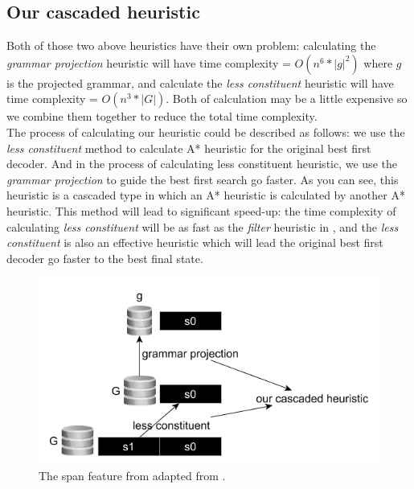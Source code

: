 \subsection{Our cascaded heuristic}
Both of those two above heuristics have their own problem: calculating the \textit{grammar projection} heuristic will have time complexity = $O(n^6*|g|^2)$ where $g$ is the projected grammar, and calculate the \textit{less constituent} heuristic will have time complexity = $O(n^3*|G|)$. Both of calculation may be a little expensive so we combine them together to reduce the total time complexity. \\
\indent The process of calculating our heuristic could be described as follows: we use the \textit{less constituent} method to calculate A* heuristic for the original best first decoder. And in the process of calculating less constituent heuristic, we use the \textit{grammar projection} to guide the best first search go faster. As you can see, this heuristic is a cascaded type in which an A* heuristic is calculated by another A* heuristic. This method will lead to significant speed-up: the time complexity of calculating \textit{less constituent} will be as fast as the \textit{filter} heuristic in \cite{2003DanNAACL}, and the \textit{less constituent} is also an effective heuristic which will lead the original best first decoder go faster to the best final state.

\begin{figure}[t]
	\centering
	\includegraphics[width=0.5 \textwidth]{cascadedAstar.png}
	\caption{\label{spanFeature}The span feature from adapted from \cite{2014David}.}
\end{figure}